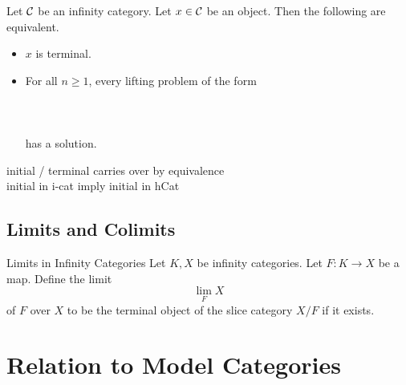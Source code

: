 \documentclass[a4paper]{article}
\begin{document}
\begin{prp}{}{} Let $\mathcal{C}$ be an infinity category. Let $x\in\mathcal{C}$ be an object. Then the following are equivalent. 
\begin{itemize}
\item $x$ is terminal. 
\item For all $n\geq 1$, every lifting problem of the form \\~\\
\\~\\
has a solution. 
\end{itemize}
\end{prp}

initial / terminal carries over by equivalence\\

initial in i-cat imply initial in hCat

\subsection{Limits and Colimits}
\begin{defn}{Limits in Infinity Categories}{} Let $K,X$ be infinity categories. Let $F:K\to X$ be a map. Define the limit $$\lim_FX$$of $F$ over $X$ to be the terminal object of the slice category $X/F$ if it exists. 
\end{defn}


\pagebreak
\section{Relation to Model Categories}
\end{document}
